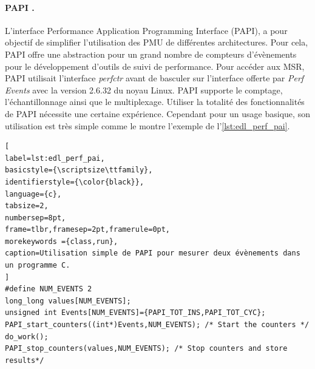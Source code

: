         \paragraph{PAPI \cite{Browne2000}.} \label{sec:papi}
            
            L'interface Performance Application Programming Interface (PAPI), a pour objectif de simplifier l'utilisation des PMU de différentes architectures. Pour cela, PAPI offre une abstraction pour un grand nombre de compteurs d'évènements pour le développement d'outils de suivi de performance. Pour accéder aux MSR, PAPI utilisait l'interface \textit{perfctr} avant de basculer sur l'interface offerte par \textit{Perf Events} avec la version 2.6.32 du noyau Linux. PAPI supporte le comptage, l'échantillonnage ainsi que le multiplexage. Utiliser la totalité des fonctionnalités de PAPI nécessite une certaine expérience. Cependant pour un usage basique, son utilisation est très simple comme le montre l'exemple de l'\autoref{lst:edl_perf_pai}.

\begin{lstlisting}[
label=lst:edl_perf_pai,
basicstyle={\scriptsize\ttfamily},
identifierstyle={\color{black}},
language={c},
tabsize=2,
numbersep=8pt,
frame=tlbr,framesep=2pt,framerule=0pt,
morekeywords ={class,run},
caption=Utilisation simple de PAPI pour mesurer deux évènements dans un programme C.
]
#define NUM_EVENTS 2  
long_long values[NUM_EVENTS];
unsigned int Events[NUM_EVENTS]={PAPI_TOT_INS,PAPI_TOT_CYC};
PAPI_start_counters((int*)Events,NUM_EVENTS); /* Start the counters */
do_work();
PAPI_stop_counters(values,NUM_EVENTS); /* Stop counters and store results*/
\end{lstlisting}

